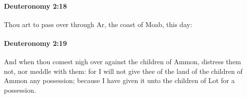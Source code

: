 		\paragraph{Deuteronomy 2:18} %
			\label{DEUTERONOMY-2-18}

			Thou art to pass over through Ar, the coast of Moab, this day:


		\paragraph{Deuteronomy 2:19} %
			\label{DEUTERONOMY-2-19}

			And when thou comest nigh over against the children of Ammon, distress them not, nor meddle with them: for I will not give thee of the land of the children of Ammon any possession; because I have given it unto the children of Lot for a possession.


